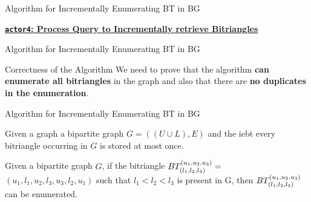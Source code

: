 \begin{frame}[fragile]{Algorithm for Incrementally Enumerating BT in BG}
  \begin{center}
    \underline{\color{red}\textbf{\texttt{actor4}: Process Query to Incrementally retrieve Bitriangles}}
  \end{center}
  \begin{center}
\end{center}
\end{frame}


\begin{frame}[fragile]{Algorithm for Incrementally Enumerating BT in BG}
  \begin{block}{Correctness of the Algorithm}
    We need to prove that the algorithm \textbf{can enumerate all bitriangles} in the graph and also that there are \textbf{no duplicates in the enumeration}.
  \end{block}
\end{frame}


\begin{frame}[fragile]{Algorithm for Incrementally Enumerating BT in BG}
  \begin{theorem} 
    Given a graph a bipartite graph $G = ((U\cup L),E)$ and the \acrshort{iebt} every bitriangle occurring in $G$ is stored at most once.
  \end{theorem}

  \begin{theorem} 
    Given a bipartite graph $G$, if the bitriangle $BT_{(l_1, l_2,l_3)}^{(u_1, u_2, u_3)} =$  $(u_1,l_1,u_2,l_3,u_3,l_2,u_1)$ such that $l_1 < l_2 <l_3$ is present in G, then $BT_{(l_1, l_2,l_3)}^{(u_1, u_2, u_3)}$ can be enumerated.
  \end{theorem}
\end{frame} 

